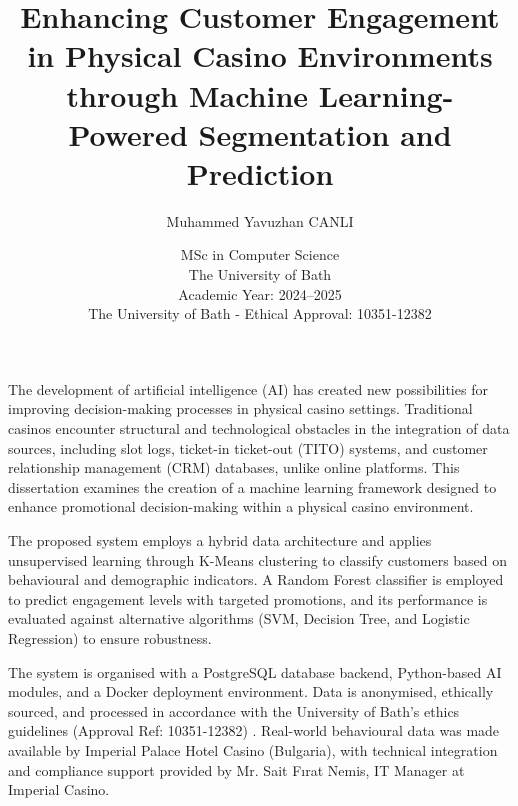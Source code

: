 \documentclass[12pt,a4paper]{report}
\title{\bf Enhancing Customer Engagement in Physical Casino Environments through Machine Learning-Powered Segmentation and Prediction}
\author{Muhammed Yavuzhan CANLI}
\date{MSc in Computer Science\\
      The University of Bath\\
      Academic Year: 2024--2025\\
      \vspace*{5cm}
      The University of Bath - Ethical Approval: 10351-12382}
\begin{document}
\sloppy
\tableofcontents


\hypersetup{pageanchor=false}

\lstset{language=Java,breaklines,breakatwhitespace,basicstyle=\small}

\setcounter{page}{0}

\maketitle
\newpage

\newpage


\newpage

\hypersetup{pageanchor=true}

\abstract
The development of artificial intelligence (AI) has created new possibilities for improving decision-making processes in physical casino settings. Traditional casinos encounter structural and technological obstacles in the integration of data sources, including slot logs, ticket-in ticket-out (TITO) systems, and customer relationship management (CRM) databases, unlike online platforms. This dissertation examines the creation of a machine learning framework designed to enhance promotional decision-making within a physical casino environment.

The proposed system employs a hybrid data architecture and applies unsupervised learning through K-Means clustering to classify customers based on behavioural and demographic indicators. A Random Forest classifier is employed to predict engagement levels with targeted promotions, and its performance is evaluated against alternative algorithms (SVM, Decision Tree, and Logistic Regression) to ensure robustness.

The system is organised with a PostgreSQL database backend, Python-based AI modules, and a Docker deployment environment. Data is anonymised, ethically sourced, and processed in accordance with the University of Bath's ethics guidelines (Approval Ref: 10351-12382) \citep{bathEthics}. Real-world behavioural data was made available by Imperial Palace Hotel Casino (Bulgaria), with technical integration and compliance support provided by Mr. Sait Fırat Nemis, IT Manager at Imperial Casino.
\end{document}

